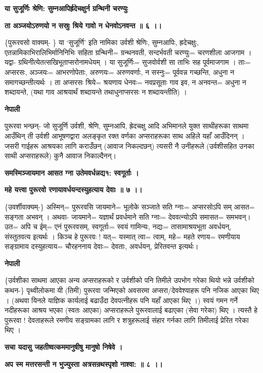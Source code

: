 \documentclass[11pt, a5paper]{article}
\begin{document}
\textbf{या सुजूर्णिः श्रेणि: सुम्नआपिर्ह्रदेचक्षुर्न ग्रन्थिनी चरण्युः}

\textbf{ता अञ्जयोऽरुणयो न सस्रुः श्रिये गावो न धेनवोऽनवन्त ॥ ६ ।।}

\{पुरूरवसो वाक्यम्- \} या ‘सुजूर्णि’ इति नामिका उर्वशी श्रेणिः, सुम्नआपिः, ह्रदेचक्षुः, एतन्नामिकाभिरालिभिर्मानिनिभिः सहिता ग्रन्थिनी= ग्रन्थनवती, सन्दर्भवती चरण्युः= चरणशीला आजगाम । यद्वा- ग्रथिनीत्येतत्सखिभूताप्सरोनामधेयम् । या सुजूर्णिः= सुजवोर्वशी सा ताभिः सह पूर्वमाजगाम । ताः= अप्सरसः, अञ्जयः= आभरणोपेताः, अरुणयः= अरुणवर्णाः, न सस्नुः= पूर्ववन्न गच्छन्ति, अधुना न समागच्छन्तीत्यर्थः । ता अप्सरसः   श्रिये= श्रयणाय धेनवः= नवप्रसूताः गाव इव, न अनवन्त= अधुना न शब्दायन्ते,  (यथा गाव आश्रयार्थं शब्दायन्ते तथाधुनाप्सरसः न शब्दायन्तीति) ।

\textbf{नेपाली}

पुरूरवा भन्छन्-  जो सुजूर्णि उर्वशी, श्रेणि, सुम्नआपि, ह्रेदचक्षु आदि अभिमानले युक्त साथीहरूका साथमा आउँथिन् ती उर्वशी आभूषणद्वारा अलङ्‌कृत रक्त वर्णका अप्सराहरूका साथ अहिले यहाँ आउँदिनन् ।  जसरी गाईहरू आश्रयका लागि कराउँछन् (आवाज निकल्दछन्) त्यसरी नै उनीहरूले (उर्वशीसहित उनका साथी अप्सराहरूले) कुनै आवाज निकाल्दैनन्।

\textbf{समस्मिञ्जायमान आसत ग्ना उतेमवर्धन्नद्य१: स्वगूर्ताः ।}

\textbf{महे यत्त्वा पुरूरवो रणायावर्धयन्दस्युहत्याय देवाः ॥ ७ ।।}

\{उवर्शीवाक्यम्-\} अस्मिन्= पुरूरवसि जायमाने= भूलोके सञ्जाते सति ग्नाः= अप्सरसोऽपि सम् आसत= सङ्गता अभवन् । अथवा- जायमाने=  यज्ञार्थं प्रवर्धमाने सति ग्नाः= देववत्न्योऽपि समासत= समभवन्। उत= अपि च ईम्= एनं पुरूरवसम्, स्वगूर्ताः= स्वयं गामिन्यः, नद्यः= तासामाश्रयभूता अवर्धयन्, संस्तुतवत्य इत्यर्थः । किञ्च हे पुरूरवः ! यत्= यस्मात् त्वा= त्वाम्, महे= महते रणाय= रमणीयाय सङ्‌ग्रामाय दस्युहत्याय= चौरहननाय देवाः= देवताः, अवर्धयन्, प्रेरितवन्त  इत्यर्थः।

\textbf{नेपाली}

\{उर्वशीका साथमा आएका अन्य अप्सराहरूको र उर्वशीको पनि तिमीले उपभोग गरेका थियो भन्ने उर्वशीको कथन-\} पृथ्वीलोकमा यी (तिमी) पुरूरवा जन्मिएको अवसरमा अप्सरा/देववेश्याहरू पनि नजिक आएका थिए । (अथवा यिनले याज्ञिक कार्यलाई बढाउँदा देवपत्नीहरू पनि यहाँ आएका थिए ।) स्वयं गमन गर्ने नदीहरूका आश्रय भएका (स्वतः आएका) अप्सराहरूले पुरूरवालाई बढाएका (सेवा गरेका) थिए ।  त्यस्तै हे पुरूरवा ! देवताहरूले रमणीय सङ्ग्रामका लागि र शत्रुहरूलाई संहार गर्नका लागि तिमीलाई प्रेरित गरेका थिए ।

\textbf{सचा यदासु जहतीष्वत्कममानुषीषु मानुषो निषेवे ।}

\textbf{अप स्म मत्तरसन्ती न भुज्युस्ता अत्रसन्रथस्पृशो नाश्वा: ॥ ८ ।।}
\end{document}
